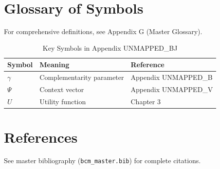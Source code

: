 
\section{Glossary of Symbols}
\label{sec:bj-glossary}

For comprehensive definitions, see Appendix G (Master Glossary).

\begin{table}[htbp]
\centering
\caption{Key Symbols in Appendix UNMAPPED_BJ}
\begin{tabular}{lll}
\toprule
\textbf{Symbol} & \textbf{Meaning} & \textbf{Reference} \\
\midrule
$\gamma$ & Complementarity parameter & Appendix UNMAPPED_B \\
$\Psi$ & Context vector & Appendix UNMAPPED_V \\
$U$ & Utility function & Chapter 3 \\
\bottomrule
\end{tabular}
\end{table}


\section{References}
\label{sec:references}

See master bibliography (\texttt{bcm\_master.bib}) for complete citations.

\nocite{bcm_master}


